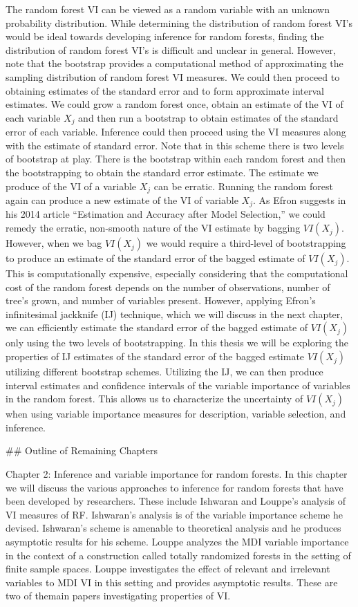 \documentclass[12pt,twoside]{reedthesis}
\theoremstyle{definition}
\theoremstyle{definition}
\theoremstyle{definition}
\theoremstyle{remark}
\begin{document}
The random forest VI can be viewed as a random variable with an unknown
probability distribution. While determining the distribution of random
forest VI's would be ideal towards developing inference for random
forests, finding the distribution of random forest VI's is difficult and
unclear in general. However, note that the bootstrap provides a
computational method of approximating the sampling distribution of
random forest VI measures. We could then proceed to obtaining estimates
of the standard error and to form approximate interval estimates. We
could grow a random forest once, obtain an estimate of the VI of each
variable \(X_j\) and then run a bootstrap to obtain estimates of the
standard error of each variable. Inference could then proceed using the
VI measures along with the estimate of standard error. Note that in this
scheme there is two levels of bootstrap at play. There is the bootstrap
within each random forest and then the bootstrapping to obtain the
standard error estimate. The estimate we produce of the VI of a variable
\(X_j\) can be erratic. Running the random forest again can produce a
new estimate of the VI of variable \(X_j\). As Efron suggests in his
2014 article ``Estimation and Accuracy after Model Selection,'' we could
remedy the erratic, non-smooth nature of the VI estimate by bagging
\(VI(X_j)\). However, when we bag \(VI(X_j)\) we would require a
third-level of bootstrapping to produce an estimate of the standard
error of the bagged estimate of \(VI(X_j)\). This is computationally
expensive, especially considering that the computational cost of the
random forest depends on the number of observations, number of tree's
grown, and number of variables present. However, applying Efron's
infinitesimal jackknife (IJ) technique, which we will discuss in the
next chapter, we can efficiently estimate the standard error of the
bagged estimate of \(VI(X_j)\) only using the two levels of
bootstrapping. In this thesis we will be exploring the properties of IJ
estimates of the standard error of the bagged estimate \(VI(X_j)\)
utilizing different bootstrap schemes. Utilizing the IJ, we can then
produce interval estimates and confidence intervals of the variable
importance of variables in the random forest. This allows us to
characterize the uncertainty of \(VI(X_j)\) when using variable
importance measures for description, variable selection, and inference.
\par
\#\# Outline of Remaining Chapters

Chapter 2: Inference and variable importance for random forests. In this
chapter we will discuss the various approaches to inference for random
forests that have been developed by researchers. These include Ishwaran
and Louppe's analysis of VI measures of RF. Ishwaran's analysis is of
the variable importance scheme he devised. Ishwaran's scheme is amenable
to theoretical analysis and he produces asymptotic results for his
scheme. Louppe analyzes the MDI variable importance in the context of a
construction called totally randomized forests in the setting of finite
sample spaces. Louppe investigates the effect of relevant and irrelevant
variables to MDI VI in this setting and provides asymptotic results.
These are two of themain papers investigating properties of VI.
\end{document}
